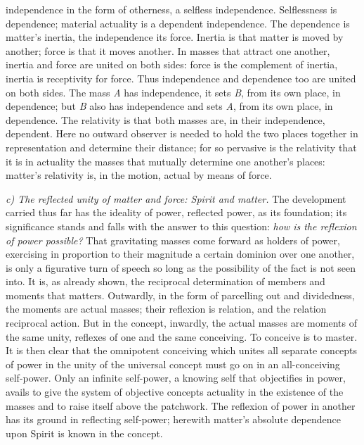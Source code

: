 \documentclass[12pt,a4paper]{book}
\newcommand{\runin}[1]{\emph{#1}\hspace{0.4em}}
\begin{document}
independence in the form of otherness, a selfless independence. Selflessness is
dependence; material actuality is a dependent independence. The dependence is
matter's inertia, the independence its force. Inertia is that matter is moved by
another; force is that it moves another. In masses that attract one another,
inertia and force are united on both sides: force is the complement of inertia,
inertia is receptivity for force. Thus independence and dependence too are united on
both sides. The mass \textit{A} has independence, it sets \textit{B}, from its own
place, in dependence; but \textit{B} also has independence and sets \textit{A}, from
its own place, in dependence. The relativity is that both masses are, in their
independence, dependent. Here no outward observer is needed to hold the two places
together in representation and determine their distance; for so pervasive is the
relativity that it is in actuality the masses that mutually determine one another's
places: matter's relativity is, in the motion, actual by means of force.

\runin{c) The reflected unity of matter and force: Spirit and matter.} The
development carried thus far has the ideality of power, reflected power, as its
foundation; its significance stands and falls with the answer to this question:
\emph{how is the reflexion of power possible?} That gravitating masses come forward
as holders of power, exercising in proportion to their magnitude a certain dominion
over one another, is only a figurative turn of speech so long as the possibility of
the fact is not seen into. It is, as already shown, the reciprocal determination of
members and moments that matters. Outwardly, in the form of parcelling out and
dividedness, the
moments are actual masses; their reflexion is relation, and the relation reciprocal
action. But in the concept, inwardly, the actual masses are moments of the same
unity, reflexes of one and the same conceiving. To conceive is to master. It is then
clear that the omnipotent conceiving which unites all separate concepts of power in
the unity of the universal concept must go on in an all-conceiving self-power. Only
an infinite self-power, a knowing self that objectifies in power, avails to give the
system of objective concepts actuality in the existence of the masses and to raise
itself above the patchwork. The reflexion of power in another has its ground in
reflecting self-power; herewith matter's absolute dependence upon Spirit is known in
the concept.
\end{document}
